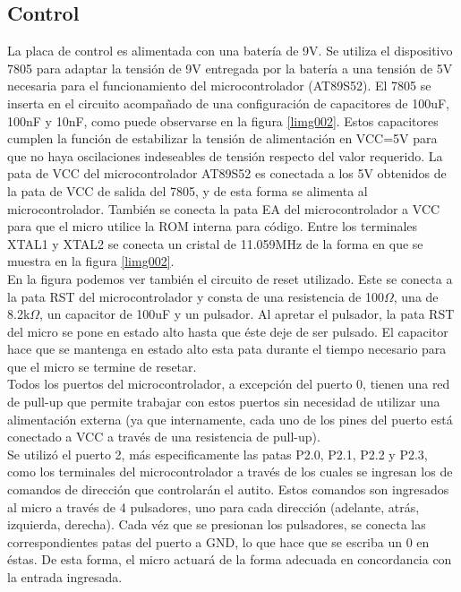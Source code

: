 \documentclass[a4paper,10pt]{article}
\begin{document}
		\subsection{Control}
			La placa de control es alimentada con una batería de 9V. Se utiliza el
			dispositivo 7805 para adaptar la tensión de 9V entregada por la batería
			a una tensión de 5V necesaria para el funcionamiento del microcontrolador (AT89S52).
			El 7805 se inserta en el circuito acompañado de una configuración de capacitores de
			100uF, 100nF y 10nF, como puede observarse en la figura \ref{limg002}. Estos capacitores cumplen la función de estabilizar la tensión de 
			alimentación en VCC=5V para que no haya oscilaciones indeseables de tensión respecto del valor requerido.
			La pata de VCC del microcontrolador AT89S52 es conectada a los 5V obtenidos de la pata de VCC de salida del 7805, y de esta forma se alimenta al 
			microcontrolador. También se conecta la pata EA del microcontrolador a VCC para que el micro utilice la ROM interna para código. Entre los terminales 
			XTAL1 y XTAL2 se conecta un cristal de 11.059MHz de la forma en que se muestra en la figura \ref{limg002}. \\
			\indent En la figura podemos ver también el circuito de reset utilizado. Este se conecta a la pata RST del microcontrolador y consta de una 
			resistencia de 100$\Omega$, una de 8.2k$\Omega$, un capacitor de 100uF y un pulsador. Al apretar el pulsador, la pata RST del micro se pone en estado 
			alto hasta que éste deje de ser pulsado. El capacitor hace que se mantenga en estado alto esta pata durante el tiempo necesario para que el micro se 
			termine de resetar.\\
			\indent Todos los puertos del microcontrolador, a excepción del puerto 0, tienen una red de pull-up que permite trabajar con estos puertos 
			sin necesidad de utilizar una alimentación externa (ya que internamente, cada uno de los pines del puerto está conectado a VCC a través de una 
			resistencia de pull-up).\\
			\indent Se utilizó el puerto 2, más especificamente las patas P2.0, P2.1, P2.2 y P2.3, como los terminales del microcontrolador a través de 
			los cuales se ingresan los de comandos de dirección que controlarán el autito. Estos comandos son ingresados al micro a través de 4 pulsadores, 
			uno para cada dirección (adelante, atrás, izquierda, derecha). Cada véz que se presionan los pulsadores, se conecta las correspondientes patas del 
			puerto a GND, lo que hace que se escriba un 0 en éstas. De esta forma, el micro actuará de la forma adecuada en concordancia con la entrada ingresada.
\end{document}
